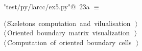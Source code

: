 \documentclass[11pt,oneside]{article}	%
\begin{document}
\begin{flushleft} \small
\begin{minipage}{\linewidth} \label{scrap55}
\protect{}\verb@"test/py/larcc/ex5.py"@\nobreak\ {\footnotesize 23a }$\equiv$
\vspace{-1ex}
\begin{list}{}{} \item
\mbox{}\verb@@\hbox{$\langle\,$Skeletons computation and vilualisation\nobreak\ {\footnotesize {}}$\,\rangle$}\verb@@\\
\mbox{}\verb@@\hbox{$\langle\,$Oriented boundary matrix visualization\nobreak\ {\footnotesize {}}$\,\rangle$}\verb@@\\
\mbox{}\verb@@\hbox{$\langle\,$Computation of oriented boundary cells\nobreak\ {\footnotesize {}}$\,\rangle$}\verb@@\\
\mbox{}\verb@@{\NWsep}
\end{list}
\vspace{-2ex}
\end{minipage}\\[4ex]
\end{flushleft}
\end{document}
